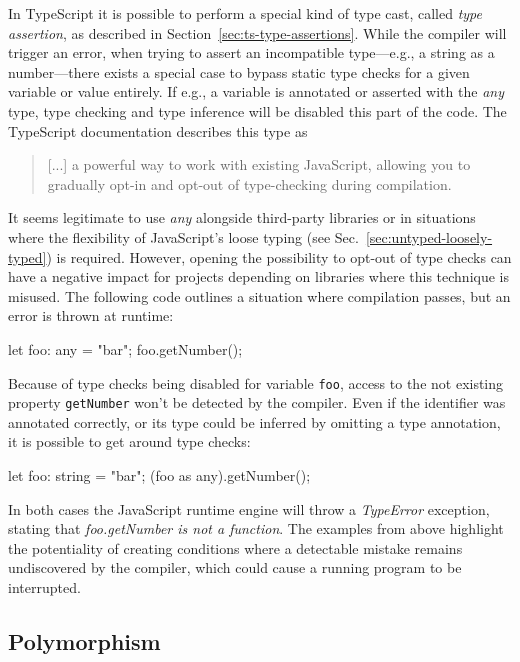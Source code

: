 In TypeScript it is possible to perform a special kind of type cast, called \emph{type assertion}, as described in Section~\ref{sec:ts-type-assertions}. While the compiler will trigger an error, when trying to assert an incompatible type---e.g.,  a string as a number---there exists a special case to bypass static type checks for a given variable or value entirely. If e.g., a variable is annotated or asserted with the \emph{any} type, type checking and type inference will be disabled this part of the code. The TypeScript documentation describes this type as 
\begin{quote}
   [...] a powerful way to work with existing JavaScript, allowing you to gradually opt-in and opt-out of type-checking during compilation.~\cite{TypeScriptHandbook:BasicTypes}
\end{quote}
It seems legitimate to use \emph{any} alongside third-party libraries or in situations where the flexibility of JavaScript's loose typing (see Sec.~\ref{sec:untyped-loosely-typed}) is required. However, opening the possibility to opt-out of type checks can have a negative impact for projects depending on libraries where this technique is misused. The following code outlines a situation where compilation passes, but an error is thrown at runtime:
\begin{JsCode}[numbers=none]
let foo: any = "bar";
foo.getNumber();
\end{JsCode}
Because of type checks being disabled for variable \texttt{foo}, access to the not existing property \texttt{getNumber} won't be detected by the compiler. Even if the identifier was annotated correctly, or its type could be inferred by omitting a type annotation, it is possible to get around type checks:
\begin{JsCode}[numbers=none]
let foo: string = "bar";
(foo as any).getNumber();
\end{JsCode}
In both cases the JavaScript runtime engine will throw a \emph{TypeError} exception, stating that \emph{foo.getNumber is not a function}. The examples from above highlight the potentiality of creating conditions where a detectable mistake remains undiscovered by the compiler, which could cause a running program to be interrupted.

\subsection{Polymorphism}

